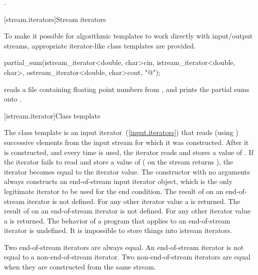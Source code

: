 \begin{itemdescr}
\pnum
\returns {}.
\end{itemdescr}

[stream.iterators]{Stream iterators}

\pnum
To make it possible for algorithmic templates to work directly with input/output streams, appropriate
iterator-like
class templates
are provided.

\enterexample
\begin{codeblock}
partial_sum(istream_iterator<double, char>{cin},
  istream_iterator<double, char>{},
  ostream_iterator<double, char>{cout, "@\textbackslash@n"});
\end{codeblock}

reads a file containing floating point numbers from
,
and prints the partial sums onto
.
\exitexample

[istream.iterator]{Class template }

\pnum
{}%
The class template
is an input iterator~(\ref{input.iterators}) that
reads (using
)
successive elements from the input stream for which it was constructed.
After it is constructed, and every time
\tcode{++}
is used, the iterator reads and stores a value of
.
If the iterator fails to read and store a value of 
(
on the stream returns
),
the iterator becomes equal to the
iterator value.
The constructor with no arguments
always constructs
an end-of-stream input iterator object, which is the only legitimate iterator to be used
for the end condition.
The result of
on an end-of-stream iterator is not defined.
For any other iterator value a
is returned.
The result of
on an end-of-stream iterator is not defined.
For any other iterator value a
is returned.
The behavior of a program that applies  to an end-of-stream
iterator is undefined.
It is impossible to store things into istream iterators.

\pnum
Two end-of-stream iterators are always equal.
An end-of-stream iterator is not
equal to a non-end-of-stream iterator.
Two non-end-of-stream iterators are equal when they are constructed from the same stream.

